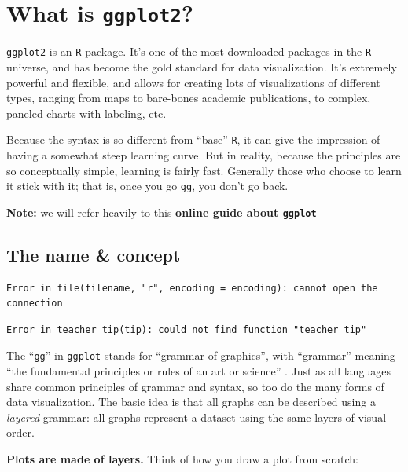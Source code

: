 \documentclass[
]{book}
\begin{document}
\section*{\texorpdfstring{What is \texttt{ggplot2}?}{What is ggplot2?}}\label{what-is-ggplot2}

\texttt{ggplot2} is an \texttt{R} package. It's one of the most downloaded packages in the \texttt{R} universe, and has become the gold standard for data visualization. It's extremely powerful and flexible, and allows for creating lots of visualizations of different types, ranging from maps to bare-bones academic publications, to complex, paneled charts with labeling, etc.

Because the syntax is so different from ``base'' \texttt{R}, it can give the impression of having a somewhat steep learning curve. But in reality, because the principles are so conceptually simple, learning is fairly fast. Generally those who choose to learn it stick with it; that is, once you go \texttt{gg}, you don't go back.

\textbf{Note:} we will refer heavily to this \href{https://ggplot2-book.org/introduction.html}{\textbf{online guide about \texttt{ggplot}}}

\subsection*{The name \& concept}\label{the-name-concept}

\begin{verbatim}
Error in file(filename, "r", encoding = encoding): cannot open the connection
\end{verbatim}

\begin{verbatim}
Error in teacher_tip(tip): could not find function "teacher_tip"
\end{verbatim}

The ``\texttt{gg}'' in \texttt{ggplot} stands for ``grammar of graphics'', with ``grammar'' meaning ``the fundamental principles or rules of an art or science'' \citep{layered-grammar}. Just as all languages share common principles of grammar and syntax, so too do the many forms of data visualization. The basic idea is that all graphs can be described using a \emph{layered} grammar: all graphs represent a dataset using the same layers of visual order.

\textbf{Plots are made of layers.} Think of how you draw a plot from scratch:
\end{document}
